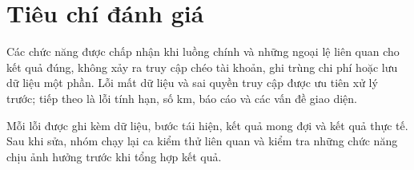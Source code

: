 \section{Tiêu chí đánh giá}
Các chức năng được chấp nhận khi luồng chính và những ngoại lệ liên quan cho kết quả đúng, không xảy ra truy cập chéo tài khoản, ghi trùng chi phí hoặc lưu dữ liệu một phần. Lỗi mất dữ liệu và sai quyền truy cập được ưu tiên xử lý trước; tiếp theo là lỗi tính hạn, số km, báo cáo và các vấn đề giao diện.

Mỗi lỗi được ghi kèm dữ liệu, bước tái hiện, kết quả mong đợi và kết quả thực tế. Sau khi sửa, nhóm chạy lại ca kiểm thử liên quan và kiểm tra những chức năng chịu ảnh hưởng trước khi tổng hợp kết quả.
